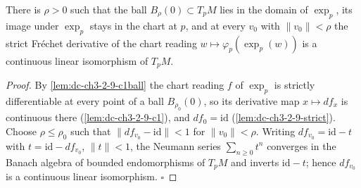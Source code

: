 \begin{lemma}
  \label{lem:dc-ch3-2-9-invertible}
  \leanok
  There is $\rho > 0$ such that the ball $B_\rho(0) \subset T_pM$ lies in the
  domain of $\exp_p$, its image under $\exp_p$ stays in the chart at $p$, and
  at every $v_0$ with $\|v_0\| < \rho$ the strict Fr\'echet derivative of the
  chart reading $w \mapsto \varphi_p(\exp_p(w))$ is a continuous linear
  isomorphism of $T_pM$.
\end{lemma}
\begin{proof}
  \leanok
  By \cref{lem:dc-ch3-2-9-c1ball} the chart reading $f$ of $\exp_p$ is strictly
  differentiable at every point of a ball $B_{\rho_0}(0)$, so its derivative
  map $x \mapsto df_x$ is continuous there (\cref{lem:dc-ch3-2-9-c1}), and
  $df_0 = \mathrm{id}$ (\cref{lem:dc-ch3-2-9-strict}). Choose
  $\rho \le \rho_0$ such that $\|df_{v_0} - \mathrm{id}\| < 1$ for
  $\|v_0\| < \rho$. Writing $df_{v_0} = \mathrm{id} - t$ with
  $t = \mathrm{id} - df_{v_0}$, $\|t\| < 1$, the Neumann series
  $\sum_{n \ge 0} t^n$ converges in the Banach algebra of bounded endomorphisms
  of $T_pM$ and inverts $\mathrm{id} - t$; hence $df_{v_0}$ is a continuous
  linear isomorphism. $\square$
\end{proof}

